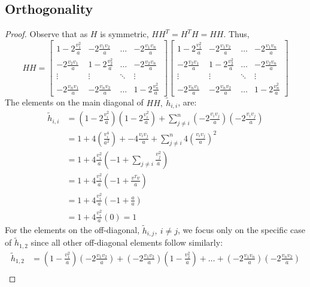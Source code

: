 \documentclass[12pt]{article}
\begin{document}
		\subsection{Orthogonality}
		\begin{proof}
			Observe that as $ H $ is symmetric, $ HH^T=H^TH=HH $. Thus, 
			\[ HH= \begin{bmatrix}
			1-2\frac{v_1^2}{a} & -2\frac{v_1v_2}{a} & \dots & -2\frac{v_1v_n}{a}\\
			-2\frac{v_2v_1}{a} & 1-2\frac{v_2^2}{a} & \dots & -2\frac{v_2v_n}{a} \\
			\vdots & \vdots & \ddots & \vdots \\
			-2\frac{v_nv_1}{a} & -2\frac{v_nv_2}{a} & \dots & 1-2\frac{v_n^2}{a}
			\end{bmatrix} \begin{bmatrix}
			1-2\frac{v_1^2}{a} & -2\frac{v_1v_2}{a} & \dots & -2\frac{v_1v_n}{a}\\
			-2\frac{v_2v_1}{a} & 1-2\frac{v_2^2}{a} & \dots & -2\frac{v_2v_n}{a} \\
			\vdots & \vdots & \ddots & \vdots \\
			-2\frac{v_nv_1}{a} & -2\frac{v_nv_2}{a} & \dots & 1-2\frac{v_n^2}{a}
			\end{bmatrix} \]
			The elements on the main diagonal of $ HH,\ \tilde{h}_{i,i}$, are: 
			\begin{align*}
				\tilde{h}_{i,i}&=(1-2\frac{v_i^2}{a})(1-2\frac{v_i^2}{a}) + \sum_{j\neq i}^{n}(-2\frac{v_iv_j}{a})(-2\frac{v_iv_j}{a}) \\
				&= 1+4(\frac{v_i^4}{a^2}) + -4\frac{v_iv_j}{a} + \sum_{j\neq i}^{n} 4  \left( \frac{v_iv_j}{a} \right)^2  \\
				&= 1+4\frac{v_i^2}{a} \left( -1 + \sum_{j\neq i} \frac{v_j^2}{a} \right) \\
				&=1+4\frac{v_i^2}{a} \left( -1 + \frac{v^Tv}{a} \right)\\
				&= 1+4\frac{v_i^2}{a} \left( -1 + \frac{a}{a} \right) \\
				&= 1+4\frac{v_i^2}{a} \left( 0 \right) = 1
			\end{align*}
			For the elements on the off-diagonal, $ \tilde{h}_{i,j},\ i\neq j $, we focus only on the specific case of $ \tilde{h}_{1,2} $ since all other off-diagonal elements follow similarly:
			\begin{align*}
				\tilde{h}_{1,2}&=(1-\frac{v_1^2}{a})(-2\frac{v_1v_2}{a})+(-2\frac{v_1v_2}{a})(1-\frac{v_2^2}{a})+\dots+(-2\frac{v_1v_n}{a})(-2\frac{v_nv_2}{a}) \\

\end{align*}
\end{proof}
\end{document}
